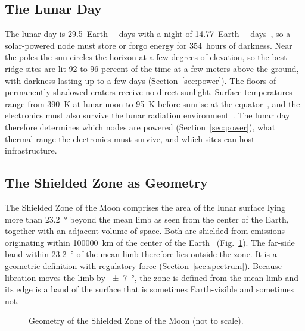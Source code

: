 \documentclass{IEEEoj}
\begin{document}
\subsection{The Lunar Day}
The lunar day is \SI{29.5}{Earth-days} with a night of \SI{14.77}{Earth-days}~\cite{lunar_sourcebook}, so a solar-powered node must store or forgo energy for \SI{354}{hours} of darkness. Near the poles the sun circles the horizon at a few degrees of elevation, so the best ridge sites are lit 92 to 96 percent of the time at a few meters above the ground, with darkness lasting up to a few days (Section~\ref{sec:power}). The floors of permanently shadowed craters receive no direct sunlight. Surface temperatures range from \SI{390}{K} at lunar noon to \SI{95}{K} before sunrise at the equator~\cite{williams_thermal2017}, and the electronics must also survive the lunar radiation environment~\cite{zhang_radiation2020,naito_radiation}. The lunar day therefore determines which nodes are powered (Section~\ref{sec:power}), what thermal range the electronics must survive, and which sites can host infrastructure.

\subsection{The Shielded Zone as Geometry}
\label{sec:szgeom}
The Shielded Zone of the Moon comprises the area of the lunar surface lying more than \SI{23.2}{\degree} beyond the mean limb as seen from the center of the Earth, together with an adjacent volume of space. Both are shielded from emissions originating within \SI{100000}{km} of the center of the Earth~\cite{itu_rr2024,itu_ra479} (Fig.~\ref{fig:szm}). The far-side band within \SI{23.2}{\degree} of the mean limb therefore lies outside the zone. It is a geometric definition with regulatory force (Section~\ref{sec:spectrum}). Because libration moves the limb by \SI{\pm 7}{\degree}, the zone is defined from the mean limb and its edge is a band of the surface that is sometimes Earth-visible and sometimes not.
\begin{figure}[!t]
\centering
\resizebox{\columnwidth}{!}{}
\caption{Geometry of the Shielded Zone of the Moon (not to scale).}
\label{fig:szm}
\end{figure}
\end{document}
